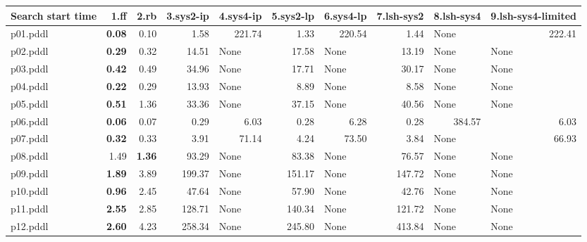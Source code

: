 \documentclass{article}
\begin{document}
\begin{tabular}{@{}lrrrrrrrrr@{}}
Search start time & 1.ff & 2.rb & 3.sys2-ip & 4.sys4-ip & 5.sys2-lp & 6.sys4-lp & 7.lsh-sys2 & 8.lsh-sys4 & 9.lsh-sys4-limited \\
\midrule
p01.pddl & \textbf{0.08} & 0.10 & 1.58 & 221.74 & 1.33 & 220.54 & 1.44 & \multicolumn{1}{|l|}{None} & 222.41 \\
p02.pddl & \textbf{0.29} & 0.32 & 14.51 & \multicolumn{1}{|l|}{None} & 17.58 & \multicolumn{1}{|l|}{None} & 13.19 & \multicolumn{1}{|l|}{None} & \multicolumn{1}{|l|}{None} \\
p03.pddl & \textbf{0.42} & 0.49 & 34.96 & \multicolumn{1}{|l|}{None} & 17.71 & \multicolumn{1}{|l|}{None} & 30.17 & \multicolumn{1}{|l|}{None} & \multicolumn{1}{|l|}{None} \\
p04.pddl & \textbf{0.22} & 0.29 & 13.93 & \multicolumn{1}{|l|}{None} & 8.89 & \multicolumn{1}{|l|}{None} & 8.58 & \multicolumn{1}{|l|}{None} & \multicolumn{1}{|l|}{None} \\
p05.pddl & \textbf{0.51} & 1.36 & 33.36 & \multicolumn{1}{|l|}{None} & 37.15 & \multicolumn{1}{|l|}{None} & 40.56 & \multicolumn{1}{|l|}{None} & \multicolumn{1}{|l|}{None} \\
p06.pddl & \textbf{0.06} & 0.07 & 0.29 & 6.03 & 0.28 & 6.28 & 0.28 & 384.57 & 6.03 \\
p07.pddl & \textbf{0.32} & 0.33 & 3.91 & 71.14 & 4.24 & 73.50 & 3.84 & \multicolumn{1}{|l|}{None} & 66.93 \\
p08.pddl & 1.49 & \textbf{1.36} & 93.29 & \multicolumn{1}{|l|}{None} & 83.38 & \multicolumn{1}{|l|}{None} & 76.57 & \multicolumn{1}{|l|}{None} & \multicolumn{1}{|l|}{None} \\
p09.pddl & \textbf{1.89} & 3.89 & 199.37 & \multicolumn{1}{|l|}{None} & 151.17 & \multicolumn{1}{|l|}{None} & 147.72 & \multicolumn{1}{|l|}{None} & \multicolumn{1}{|l|}{None} \\
p10.pddl & \textbf{0.96} & 2.45 & 47.64 & \multicolumn{1}{|l|}{None} & 57.90 & \multicolumn{1}{|l|}{None} & 42.76 & \multicolumn{1}{|l|}{None} & \multicolumn{1}{|l|}{None} \\
p11.pddl & \textbf{2.55} & 2.85 & 128.71 & \multicolumn{1}{|l|}{None} & 140.34 & \multicolumn{1}{|l|}{None} & 121.72 & \multicolumn{1}{|l|}{None} & \multicolumn{1}{|l|}{None} \\
p12.pddl & \textbf{2.60} & 4.23 & 258.34 & \multicolumn{1}{|l|}{None} & 245.80 & \multicolumn{1}{|l|}{None} & 413.84 & \multicolumn{1}{|l|}{None} & \multicolumn{1}{|l|}{None} \\

\end{tabular}
\end{document}
